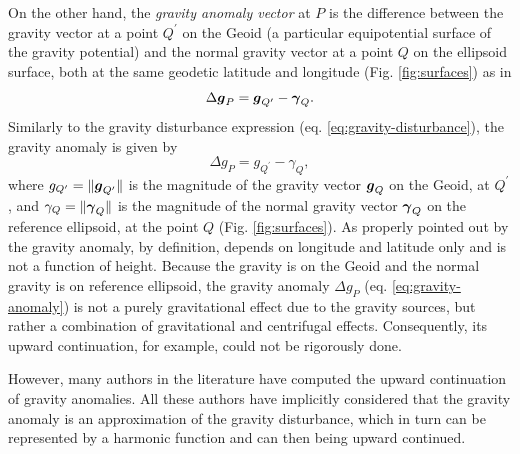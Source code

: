 \documentclass[extra]{gji}
\begin{document}
On the other hand, the \textit{gravity anomaly vector} at $P$
is the difference between the gravity
vector at a point $Q^{\prime}$ on the Geoid (a particular
equipotential surface of the gravity potential) and the normal
gravity vector at a point $Q$ on the ellipsoid surface, both at the
same geodetic latitude and longitude (Fig. \ref{fig:surfaces}) as in
\begin{equation}
\Delta \mitbf{g}_{P} = \mitbf{g}_{Q^{\prime}} - \mitbf{\gamma}_{Q} .
\label{eq:gravity-anomaly-vector}
\end{equation}
Similarly to the gravity disturbance expression (eq.
\ref{eq:gravity-disturbance}), the gravity anomaly is given by
\begin{equation}
\Delta g_{P} = g_{Q^{\prime}} - \gamma_{Q} ,
\label{eq:gravity-anomaly}
\end{equation}
where $g_{Q^{\prime} } = \| \mitbf{g}_{Q^{\prime}} \|$ is
the magnitude of the gravity vector $\mitbf{g}_{Q}$ on the Geoid,
at $Q^{\prime}$, and $\gamma_{Q} = \| \mitbf{\gamma}_{Q} \|$ is the
magnitude of the normal gravity vector $\mitbf{\gamma}_{Q}$
on the reference ellipsoid, at the point $Q$ (Fig. \ref{fig:surfaces}).
As properly pointed out by \citet{barthelmes2013} the gravity anomaly,
by definition, depends on
longitude and latitude only and is not a function of height.
Because the gravity is on the Geoid and the normal gravity
is on reference ellipsoid, the gravity anomaly $\Delta g_{P}$
(eq. \ref{eq:gravity-anomaly}) is not a purely gravitational effect
due to the gravity sources, but rather a combination of gravitational
and centrifugal effects. Consequently, its upward continuation,
for example, could not be rigorously done.

However, many authors in the literature have computed the upward
continuation of gravity anomalies. All these authors have
implicitly considered that the gravity anomaly is an approximation of
the gravity disturbance, which in turn can be represented by a
harmonic function and can then being upward continued.
\end{document}
